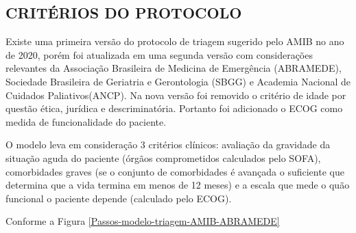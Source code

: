 \documentclass[12pt]{article}
\begin{document}


\subsection{CRITÉRIOS DO PROTOCOLO}

Existe uma primeira versão do protocolo de triagem sugerido pelo AMIB no ano de 2020, porém foi atualizada em uma segunda versão com considerações relevantes da Associação Brasileira de
Medicina de Emergência (ABRAMEDE), Sociedade Brasileira de Geriatria e Gerontologia (SBGG) e Academia Nacional de Cuidados Paliativos(ANCP). Na nova versão foi removido o critério de idade por questão ética, jurídica e descriminatória. Portanto foi adicionado o ECOG como medida de funcionalidade do paciente.

O modelo leva em consideração 3 critérios clínicos: avaliação da gravidade da situação aguda do paciente (órgãos comprometidos calculados pelo SOFA), comorbidades graves (se o conjunto de comorbidades é avançada o suficiente que determina que a vida termina em menos de 12 meses) e a escala que mede o quão funcional o paciente depende (calculado pelo ECOG).

Conforme a Figura \ref{Passos-modelo-triagem-AMIB-ABRAMEDE}
\end{document}
